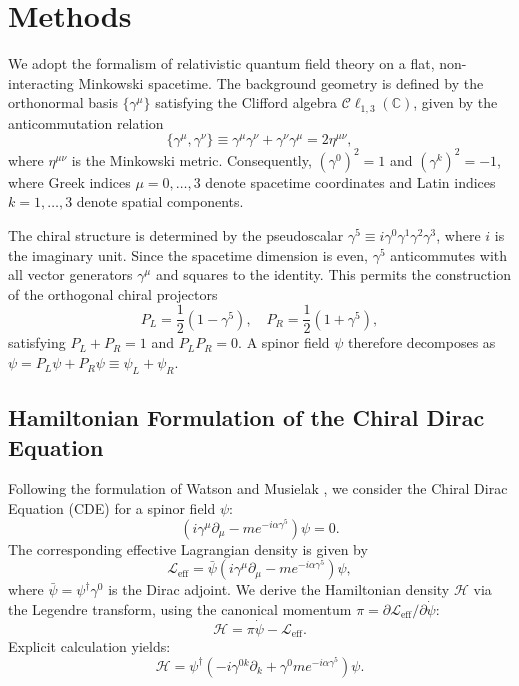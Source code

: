 \section{Methods}
\label{sec:Methods}

We adopt the formalism of relativistic quantum field theory on a flat,
non-interacting Minkowski spacetime. The background geometry is defined by the
orthonormal basis $\{ \gamma^\mu \}$ satisfying the Clifford algebra
$\mathcal{C}\ell_{1,3}(\mathbb{C})$, given by the anticommutation relation
\begin{equation}
	\{ \gamma^\mu, \gamma^\nu \} \equiv \gamma^\mu \gamma^\nu + \gamma^\nu
	\gamma^\mu = 2 \eta^{\mu \nu},
\end{equation}
where $\eta^{\mu \nu}$ is the Minkowski metric. Consequently, $(\gamma^0)^2 = 1$
and $(\gamma^k)^2 = -1$, where Greek indices $\mu = 0, \dots, 3$ denote
spacetime coordinates and Latin indices $k = 1, \dots, 3$ denote spatial
components.

The chiral structure is determined by the pseudoscalar $\gamma^5 \equiv i
\gamma^0 \gamma^1 \gamma^2 \gamma^3$, where $i$ is the imaginary unit. Since
the spacetime dimension is even, $\gamma^5$ anticommutes with all vector
generators $\gamma^\mu$ and squares to the identity. This permits the
construction of the orthogonal chiral projectors
\begin{equation}
	P_L = \frac{1}{2}(1 - \gamma^5), \quad P_R = \frac{1}{2} (1 + \gamma^5),
\end{equation}
satisfying $P_L + P_R = 1$ and $P_L P_R = 0$. A spinor field $\psi$ therefore
decomposes as $\psi = P_L \psi + P_R \psi \equiv \psi_L + \psi_R$.

\subsection{Hamiltonian Formulation of the Chiral Dirac Equation}

Following the formulation of Watson and Musielak \cite{watson2020a,
watson2021a, Watson2022}, we consider the Chiral Dirac Equation (CDE) for a
spinor field $\psi$:
\begin{equation}
	(i \gamma^\mu \partial_\mu - m e^{- i \alpha \gamma^5}) \psi = 0.
	\label{eq:CDE}
\end{equation}
The corresponding effective Lagrangian density is given by
\begin{equation}
	\mathcal{L}_{\text{eff}} = \bar{\psi} (i \gamma^\mu \partial_\mu - m
	e^{- i \alpha \gamma^5}) \psi,
\end{equation}
where $\bar{\psi} = \psi^\dagger \gamma^0$ is the Dirac adjoint. We derive the
Hamiltonian density $\mathcal{H}$ via the Legendre transform, using the
canonical momentum $\pi = \partial \mathcal{L}_{\text{eff}} / \partial
\dot{\psi}$:
\begin{equation}
	\mathcal{H} = \pi \dot{\psi} - \mathcal{L}_{\text{eff}}.
\end{equation}
Explicit calculation yields:
\begin{equation}
	\mathcal{H} = \psi^\dagger (- i \gamma^{0k} \partial_k + \gamma^0 m e^{-i \alpha
	\gamma^5}) \psi.
\end{equation}
